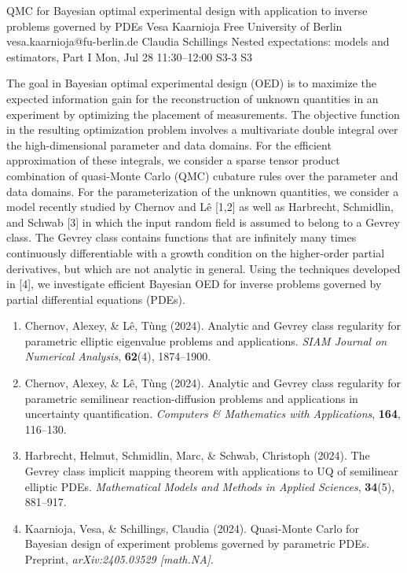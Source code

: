 \begin{talk}
  {QMC for Bayesian optimal experimental design with application to inverse problems governed by PDEs}%
  {Vesa Kaarnioja}%
  {Free University of Berlin}%
  {vesa.kaarnioja@fu-berlin.de}%
  {Claudia Schillings}%
  {Nested expectations: models and estimators, Part I}%
  {Mon, Jul 28 11:30--12:00}%
  {S3-3}%
  {S3}%
    
   
The goal in Bayesian optimal experimental design (OED) is to maximize the expected information gain for the reconstruction of unknown quantities in an experiment by optimizing the placement of measurements. The objective function in the resulting optimization problem involves a multivariate double integral over the high-dimensional parameter and data domains. For the efficient approximation of these integrals, we consider a sparse tensor product combination of quasi-Monte Carlo (QMC) cubature rules over the parameter and data domains. For the parameterization of the unknown quantities, we consider a model recently studied by Chernov and L\^{e} [1,2] as well as Harbrecht, Schmidlin, and Schwab [3] in which the input random field is assumed to belong to a Gevrey class. The Gevrey class contains functions that are infinitely many times continuously differentiable with a growth condition on the higher-order partial derivatives, but which are not analytic in general. Using the techniques developed in [4], we investigate efficient Bayesian OED for inverse problems governed by partial differential equations (PDEs).
\begin{enumerate}
 \item[{[1]}] Chernov, Alexey, \& L\^{e}, T\`{u}ng (2024). Analytic and Gevrey class regularity for parametric elliptic eigenvalue problems and applications. \emph{SIAM Journal on Numerical Analysis}, \textbf{62}(4), 1874--1900.
 \item[{[2]}] Chernov, Alexey, \& L\^{e}, T\`{u}ng (2024). Analytic and Gevrey class regularity for parametric semilinear reaction-diffusion problems and applications in uncertainty quantification. \emph{Computers \& Mathematics with Applications}, \textbf{164}, 116--130.
 \item[{[3]}] Harbrecht, Helmut, Schmidlin, Marc, \& Schwab, Christoph (2024). The Gevrey class implicit mapping theorem with applications to UQ of semilinear elliptic PDEs. \emph{Mathematical Models and Methods in Applied Sciences}, \textbf{34}(5), 881--917.
 \item[{[4]}] Kaarnioja, Vesa, \& Schillings, Claudia (2024). Quasi-Monte Carlo for Bayesian design of experiment problems governed by parametric PDEs. Preprint, \emph{arXiv:2405.03529 [math.NA]}.
\end{enumerate}

\end{talk}

